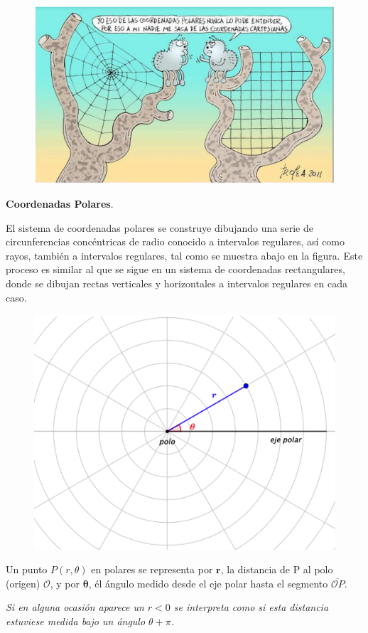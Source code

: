 \vspace{5mm}

\begin{figure}[H]
	\centering
	\includegraphics[width=.65\textwidth]{img-polares/polares19.png}
	\end{figure}

\vspace{5mm}

\large{\textbf{Coordenadas Polares}}\normalsize{.}

\begin{multicols}{2}
El sistema de coordenadas polares se construye dibujando una serie de circunferencias concéntricas de radio conocido a intervalos regulares, así como rayos, también a intervalos regulares, tal como se muestra abajo en la figura. Este proceso es similar al que se sigue en un sistema de coordenadas rectangulares, donde se dibujan rectas verticales y horizontales a intervalos regulares en cada caso.

\begin{figure}[H]
	\centering
	\includegraphics[width=.4\textwidth]{img-polares/polares20.png}
	\end{figure}
\end{multicols}

\vspace{5mm}

\begin{cuadro-naranja}
Un punto $P(r,\theta)$ en polares se representa por $\boldsymbol r$, la distancia de P al polo (origen) $\mathcal O$, y por $\boldsymbol \theta$, él ángulo medido desde el eje polar hasta el segmento $\overline{\mathcal {O} P}$.

\emph{Si en alguna ocasión aparece un $r<0$ se interpreta como si esta distancia estuviese medida bajo un ángulo $\theta + \pi$.}
\end{cuadro-naranja}

